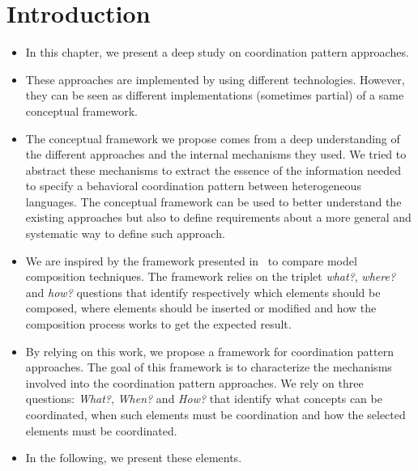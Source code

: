 \section{Introduction}
\begin{itemize}
\item In this chapter, we present a deep study on coordination pattern approaches. 

\item These approaches are implemented by using different technologies. However, they can be seen as different implementations (sometimes partial) of a same conceptual framework.

\item The conceptual framework we propose comes from a deep understanding of the different approaches and the internal mechanisms they used. We tried to abstract these mechanisms to extract the essence of the information needed to specify a behavioral coordination pattern between heterogeneous languages. The conceptual framework can be used to better understand the existing approaches but also to define requirements about a more general and systematic way to define such approach.


\item We are inspired by the framework presented in~\cite{framecompoas} to compare model
composition techniques. The framework relies on the triplet \emph{what?}, \emph{where?} and \emph{how?} questions that identify respectively which elements should be composed, where elements should be inserted or modified and how the composition process works to get the expected result. 


\item By relying on this work, we propose a framework for coordination pattern approaches. The goal of this framework is to characterize the mechanisms involved into the coordination pattern approaches. We rely on three questions: \emph{What?}, \emph{When?} and \emph{How?} that identify what concepts can be coordinated, when such elements must be coordination and how the selected elements must be coordinated.   
 

\item In the following, we present these elements.     
	
\end{itemize}

